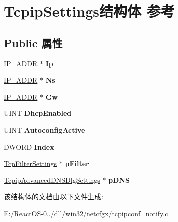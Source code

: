 \hypertarget{struct_tcpip_settings}{}\section{Tcpip\+Settings结构体 参考}
\label{struct_tcpip_settings}
\subsection*{Public 属性}
\begin{DoxyCompactItemize}
\item 
\mbox{\label{struct_tcpip_settings_a45c4ff86ad68c54f7d5b19c3f2549b95}} 
\hyperlink{structtag_i_p___a_d_d_r}{I\+P\+\_\+\+A\+D\+DR} $\ast$ {\bfseries Ip}
\item 
\mbox{\label{struct_tcpip_settings_a1d2a95a781f37e4af6fca24dd3012716}} 
\hyperlink{structtag_i_p___a_d_d_r}{I\+P\+\_\+\+A\+D\+DR} $\ast$ {\bfseries Ns}
\item 
\mbox{\label{struct_tcpip_settings_a5201215fec788b47b38a259a283f359e}} 
\hyperlink{structtag_i_p___a_d_d_r}{I\+P\+\_\+\+A\+D\+DR} $\ast$ {\bfseries Gw}
\item 
\mbox{\label{struct_tcpip_settings_a3a3fbda53923a3f077d3e76877ae2535}} 
U\+I\+NT {\bfseries Dhcp\+Enabled}
\item 
\mbox{\label{struct_tcpip_settings_a210e47732482bc8deff355f66111f8d8}} 
U\+I\+NT {\bfseries Autoconfig\+Active}
\item 
\mbox{\label{struct_tcpip_settings_a422a4b5dd316340a30b753329afb3d0d}} 
D\+W\+O\+RD {\bfseries Index}
\item 
\mbox{\label{struct_tcpip_settings_ad67aa302d09b9ad8f3c19161c6305c62}} 
\hyperlink{struct_tcp_filter_settings}{Tcp\+Filter\+Settings} $\ast$ {\bfseries p\+Filter}
\item 
\mbox{\label{struct_tcpip_settings_a5fca02829da58d4295263eacd6281532}} 
\hyperlink{struct_tcpip_advanced_d_n_s_dlg_settings}{Tcpip\+Advanced\+D\+N\+S\+Dlg\+Settings} $\ast$ {\bfseries p\+D\+NS}
\end{DoxyCompactItemize}


该结构体的文档由以下文件生成\+:\begin{DoxyCompactItemize}
\item 
E\+:/\+React\+O\+S-\/0../dll/win32/netcfgx/tcpipconf\+\_\+notify.\+c\end{DoxyCompactItemize}
